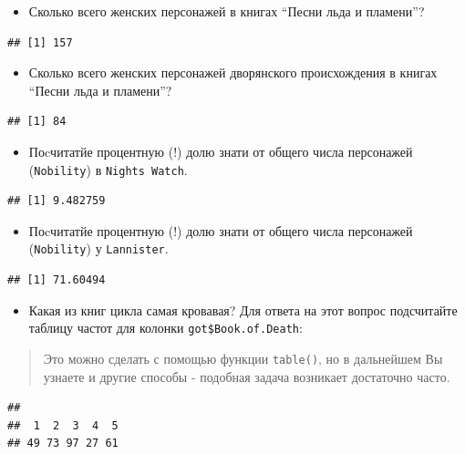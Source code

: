 \documentclass[]{book}
\providecommand{\tightlist}{%
  \setlength{\itemsep}{0pt}\setlength{\parskip}{0pt}}
\begin{document}
\begin{itemize}
\tightlist
\item
  Сколько всего женских персонажей в книгах ``Песни льда и пламени''?
\end{itemize}

\begin{verbatim}
## [1] 157
\end{verbatim}

\begin{itemize}
\tightlist
\item
  Сколько всего женских персонажей дворянского происхождения в книгах ``Песни льда и пламени''?
\end{itemize}

\begin{verbatim}
## [1] 84
\end{verbatim}

\begin{itemize}
\tightlist
\item
  Поcчитатйе процентную (!) долю знати от общего числа персонажей (\texttt{Nobility}) в \texttt{Night\textquotesingle{}s\ Watch}.
\end{itemize}

\begin{verbatim}
## [1] 9.482759
\end{verbatim}

\begin{itemize}
\tightlist
\item
  Поcчитатйе процентную (!) долю знати от общего числа персонажей (\texttt{Nobility}) у \texttt{Lannister}.
\end{itemize}

\begin{verbatim}
## [1] 71.60494
\end{verbatim}

\begin{itemize}
\tightlist
\item
  Какая из книг цикла самая кровавая? Для ответа на этот вопрос подсчитайте таблицу частот для колонки \texttt{got\$Book.of.Death}:
\end{itemize}

\begin{quote}
Это можно сделать с помощью функции \texttt{table()}, но в дальнейшем Вы узнаете и другие способы - подобная задача возникает достаточно часто.
\end{quote}

\begin{verbatim}
## 
##  1  2  3  4  5 
## 49 73 97 27 61
\end{verbatim}
\end{document}
